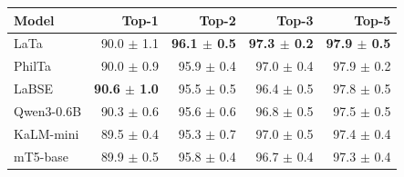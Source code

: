 \begin{tabular}{lrrrr}
\toprule
\textbf{Model} & \textbf{Top-1} & \textbf{Top-2} & \textbf{Top-3} & \textbf{Top-5} \\
\midrule
LaTa & 90.0 $\pm$ 1.1 & \textbf{96.1 $\pm$ 0.5} & \textbf{97.3 $\pm$ 0.2} & \textbf{97.9 $\pm$ 0.5} \\
PhilTa & 90.0 $\pm$ 0.9 & 95.9 $\pm$ 0.4 & 97.0 $\pm$ 0.4 & 97.9 $\pm$ 0.2 \\
LaBSE & \textbf{90.6 $\pm$ 1.0} & 95.5 $\pm$ 0.5 & 96.4 $\pm$ 0.5 & 97.8 $\pm$ 0.5 \\
Qwen3-0.6B & 90.3 $\pm$ 0.6 & 95.6 $\pm$ 0.6 & 96.8 $\pm$ 0.5 & 97.5 $\pm$ 0.5 \\
KaLM-mini & 89.5 $\pm$ 0.4 & 95.3 $\pm$ 0.7 & 97.0 $\pm$ 0.5 & 97.4 $\pm$ 0.4 \\
mT5-base & 89.9 $\pm$ 0.5 & 95.8 $\pm$ 0.4 & 96.7 $\pm$ 0.4 & 97.3 $\pm$ 0.4 \\
\bottomrule
\end{tabular}
